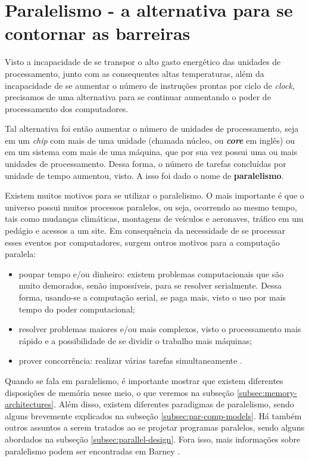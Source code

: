 \section{Paralelismo - a alternativa para se contornar as barreiras}

	\label{sec:parallelism}
    
    Visto a incapacidade de se transpor o alto gasto energético das 
    unidades de processamento, junto com as consequentes altas temperaturas,
    além da incapacidade de se aumentar o número de instruções prontas por 
    ciclo de \textit{clock}, precisamos de uma alternativa para se continuar 
    aumentando o poder de processamento dos computadores. 
    
    Tal alternativa foi então aumentar o número de unidades de processamento,
    seja em um \textit{chip} com mais de uma unidade (chamada núcleo, ou 
    \textbf{\textit{core}} em inglês) ou em um sistema com mais de uma 
    máquina, que por sua vez possui uma ou mais unidades de processamento. 
    Dessa forma, o número de tarefas concluídas por unidade de tempo aumentou,
    visto.
    A isso foi dado o nome de \textbf{paralelismo}.
    
    Existem muitos motivos para se utilizar o paralelismo. O mais importante é
    que o universo possui muitos processos paralelos, ou seja, ocorrendo ao 
    mesmo tempo, tais como mudanças climáticas, montagens de veículos e 
    aeronaves, tráfico em um pedágio e acessos a um site. Em consequência da 
    necessidade de se processar esses eventos por computadores, surgem outros motivos para a computação paralela:
    \begin{itemize}
    	\item poupar tempo e/ou dinheiro: existem problemas computacionais 
    	que são muito demorados, senão impossíveis, para se resolver
    	serialmente. Dessa forma, usando-se a computação serial, se paga mais,
    	visto o uso por mais tempo do poder computacional;
    	\item resolver problemas maiores e/ou mais complexos, visto o
    	processamento mais rápido e a possibilidade de se dividir o trabalho
    	mais máquinas;
    	\item prover concorrência: realizar várias tarefas simultaneamente
    	\cite{LLNL:parcomp}.
    \end{itemize}
    
    Quando se fala em paralelismo, é importante mostrar que existem diferentes
    disposições de memória nesse meio, o que veremos na subseção
    \ref{subsec:memory-architectures}. Além disso, existem diferentes
    paradigmas de paralelismo, sendo alguns brevemente explicados na subseção
    \ref{subsec:par-comp-models}. Há também outros assuntos a serem tratados 
    ao se projetar programas paralelos, sendo alguns abordados na subseção 
    \ref{subsec:parallel-design}. Fora isso, mais informações sobre 
    paralelismo podem ser encontradas em Barney \cite{LLNL:parcomp}.
    
